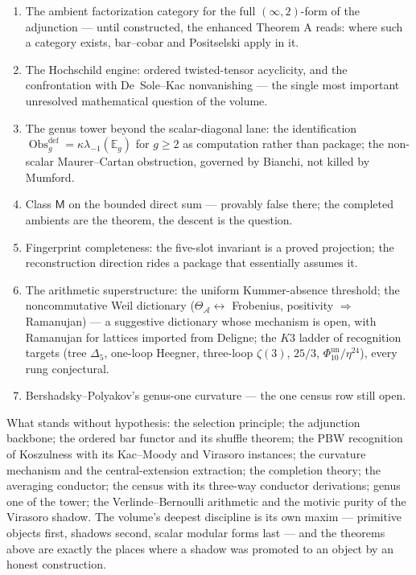 \documentclass[11pt]{article}
\providecommand{\cA}{\mathcal{A}}
\providecommand{\bE}{\mathbb{E}}
\providecommand{\Dfive}{\Delta_5}
\providecommand{\Phiten}{\Phi_{10}}
\providecommand{\Obs}{\operatorname{Obs}}
\begin{document}
\begin{enumerate}
\item The ambient factorization category for the full
$(\infty,2)$-form of the adjunction --- until constructed, the
enhanced Theorem A reads: where such a category exists, bar--cobar
and Positselski apply in it.
\item The Hochschild engine: ordered twisted-tensor acyclicity, and
the confrontation with De~Sole--Kac nonvanishing --- the single most
important unresolved mathematical question of the volume.
\item The genus tower beyond the scalar-diagonal lane: the
identification $\Obs^{\mathrm{def}}_g=\kappa\lambda_{-1}(\bE_g)$ for
$g\ge2$ as computation rather than package; the non-scalar
Maurer--Cartan obstruction, governed by Bianchi, not killed by
Mumford.
\item Class $\mathsf M$ on the bounded direct sum --- provably false
there; the completed ambients are the theorem, the descent is the
question.
\item Fingerprint completeness: the five-slot invariant is a proved
projection; the reconstruction direction rides a package that
essentially assumes it.
\item The arithmetic superstructure: the uniform Kummer-absence
threshold; the noncommutative Weil dictionary
\textup{($\Theta_\cA\leftrightarrow$ Frobenius, positivity
$\Rightarrow$ Ramanujan)} --- a suggestive dictionary whose mechanism
is open, with Ramanujan for lattices imported from Deligne;
the $K3$ ladder of recognition targets \textup{(tree $\Dfive$,
one-loop Heegner, three-loop
$\zeta(3)$, $25/3$, $\Phiten^{\mathrm{un}}/\eta^{24}$)}, every rung
conjectural.
\item Bershadsky--Polyakov's genus-one curvature --- the one census
row still open.
\end{enumerate}

What stands without hypothesis: the selection principle; the
adjunction backbone; the ordered bar functor and its shuffle theorem;
the PBW recognition of Koszulness with its Kac--Moody and Virasoro
instances; the curvature mechanism and the central-extension
extraction; the completion theory; the averaging conductor; the
census with its three-way conductor derivations; genus one of the
tower; the Verlinde--Bernoulli arithmetic and the motivic purity of
the Virasoro shadow. The volume's deepest discipline is its own
maxim --- primitive objects first, shadows second, scalar modular
forms last --- and the theorems above are exactly the places where a
shadow was promoted to an object by an honest construction.
\end{document}
